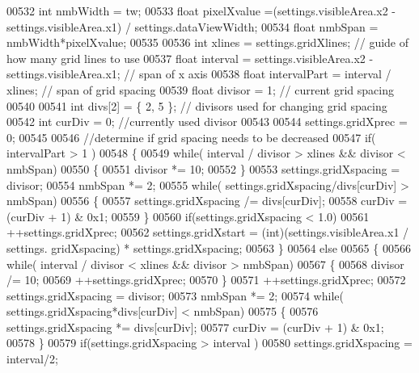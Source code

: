 \begin{DoxyCode}
{{{{{{{{00532     \textcolor{keywordtype}{int} nmbWidth = tw;
00533     \textcolor{keywordtype}{float} pixelXvalue =(settings.visibleArea.x2 - settings.visibleArea.x1) / 
      settings.dataViewWidth;
00534     \textcolor{keywordtype}{float} nmbSpan = nmbWidth*pixelXvalue;
00535 
00536     \textcolor{keywordtype}{int} xlines = settings.gridXlines;  \textcolor{comment}{// guide of how many grid lines to use}
00537     \textcolor{keywordtype}{float} interval = settings.visibleArea.x2 - settings.visibleArea.x1; \textcolor{comment}{// span of x axis}
00538     \textcolor{keywordtype}{float} intervalPart = interval / xlines; \textcolor{comment}{// span of grid spacing}
00539     \textcolor{keywordtype}{float} divisor = 1; \textcolor{comment}{// current grid spacing}
00540 
00541     \textcolor{keywordtype}{int} divs[2] = \{ 2, 5 \};  \textcolor{comment}{// divisors used for changing grid spacing}
00542     \textcolor{keywordtype}{int} curDiv = 0; \textcolor{comment}{//currently used divisor}
00543 
00544     settings.gridXprec = 0;
00545 
00546     \textcolor{comment}{//determine if grid spacing needs to be decreased}
00547     \textcolor{keywordflow}{if}( intervalPart > 1 )
00548     \{
00549         \textcolor{keywordflow}{while}( interval / divisor > xlines && divisor < nmbSpan)
00550         \{
00551             divisor *= 10;
00552         \}
00553         settings.gridXspacing = divisor;
00554         nmbSpan *= 2;
00555         \textcolor{keywordflow}{while}( settings.gridXspacing/divs[curDiv] > nmbSpan)
00556         \{
00557             settings.gridXspacing /= divs[curDiv];
00558             curDiv = (curDiv + 1) & 0x1;
00559         \}
00560         \textcolor{keywordflow}{if}(settings.gridXspacing < 1.0)
00561             ++settings.gridXprec;
00562         settings.gridXstart = (int)(settings.visibleArea.x1 / settings.
      gridXspacing) * settings.gridXspacing;
00563     \}
00564     \textcolor{keywordflow}{else}
00565     \{
00566         \textcolor{keywordflow}{while}( interval / divisor < xlines && divisor > nmbSpan)
00567         \{
00568             divisor /= 10;
00569             ++settings.gridXprec;
00570         \}
00571         ++settings.gridXprec;
00572         settings.gridXspacing = divisor;
00573         nmbSpan *= 2;
00574         \textcolor{keywordflow}{while}( settings.gridXspacing*divs[curDiv] < nmbSpan)
00575         \{
00576             settings.gridXspacing *= divs[curDiv];
00577             curDiv = (curDiv + 1) & 0x1;
00578         \}
00579         \textcolor{keywordflow}{if}(settings.gridXspacing > interval )
00580             settings.gridXspacing = interval/2;
}}}}}}}}
\end{DoxyCode}
